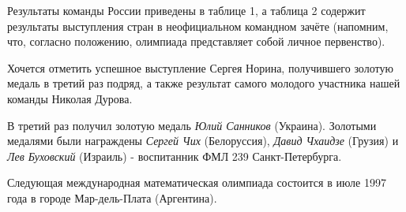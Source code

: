 \documentclass[a4paper,9pt]{article}
\begin{document}
\begin{multicols}{3}
Результаты команды России приведены в таблице 1, а таблица 2 содержит результаты выступления стран в неофициальном командном зачёте (напомним, что, согласно положению, олимпиада представляет собой личное первенство).

Хочется отметить успешное выступление Сергея Норина, получившего золотую медаль в третий раз подряд, а также результат самого молодого участника нашей команды Николая Дурова.

В третий раз получил золотую медаль \textit{Юлий Санников} (Украина). Золотыми медалями были награждены \textit{Сергей Чих} (Белоруссия), \textit{Давид Чхаидзе} (Грузия) и \textit{Лев Буховский} (Израиль) - воспитанник ФМЛ 239 Санкт-Петербурга.

Следующая международная математическая олимпиада состоится в июле 1997 года в городе Мар-дель-Плата (Аргентина).

\end{multicols}
\end{document}
